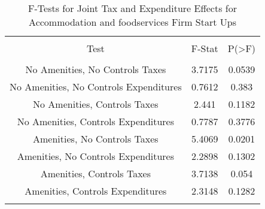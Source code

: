
\begin{table}[!htbp] \centering 
  \caption{F-Tests for Joint Tax and Expenditure Effects for Accommodation and foodservices Firm Start Ups} 
  \label{72Ftests} 
\begin{tabular}{@{\extracolsep{5pt}} ccc} 
\\[-1.8ex]\hline 
\hline \\[-1.8ex] 
Test & F-Stat & P(\textgreater F) \\ 
\hline \\[-1.8ex] 
No Amenities, No Controls Taxes & 3.7175 & 0.0539 \\ 
No Amenities, No Controls Expenditures & 0.7612 & 0.383 \\ 
No Amenities, Controls Taxes & 2.441 & 0.1182 \\ 
No Amenities, Controls Expenditures & 0.7787 & 0.3776 \\ 
Amenities, No Controls Taxes & 5.4069 & 0.0201 \\ 
Amenities, No Controls Expenditures & 2.2898 & 0.1302 \\ 
Amenities, Controls Taxes & 3.7138 & 0.054 \\ 
Amenities, Controls Expenditures & 2.3148 & 0.1282 \\ 
\hline \\[-1.8ex] 
\end{tabular} 
\end{table} 
